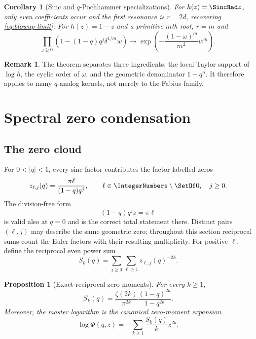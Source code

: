 \documentclass[11pt]{article}
\newtheorem{proposition}[theorem]{Proposition}
\newtheorem{corollary}[theorem]{Corollary}
\theoremstyle{definition}
\newtheorem{remark}[theorem]{Remark}
\begin{document}
\begin{corollary}[Sinc and $q$-Pochhammer specializations]
For $h(z)=\SincRad z$, only even coefficients occur and the first resonance is $r=2d$, recovering \cref{eq:blowup-limit}.  For $h(z)=1-z$ and a primitive $m$th root, $r=m$ and
\begin{equation}
 \prod_{j\ge0}
 \left(1-(1-q)q^j\delta^{1/m}w\right)
 \longrightarrow
 \exp\left(-\frac{(1-\omega)^m}{m^2}w^m\right).
 \label{eq:qpoch-germ-limit}
\end{equation}
\end{corollary}

\begin{remark}
The theorem separates three ingredients: the local Taylor support of $\log h$, the cyclic order of $\omega$, and the geometric denominator $1-q^n$.  It therefore applies to many $q$-analog kernels, not merely to the Fabius family.
\end{remark}

\section{Spectral zero condensation}

\subsection{The zero cloud}

For $0<|q|<1$, every sinc factor contributes the factor-labelled zeros
\begin{equation}
 z_{\ell,j}(q)=\frac{\pi\ell}{(1-q)q^j},
 \qquad \ell\in\IntegerNumbers\setminus\SetOf0,
 \quad j\ge0.
 \label{eq:zeros}
\end{equation}
The division-free form
\[
 (1-q)q^jz=\pi\ell
\]
is valid also at $q=0$ and is the correct total statement there.  Distinct
pairs $(\ell,j)$ may describe the same geometric zero; throughout this
section reciprocal sums count the Euler factors with their resulting
multiplicity.
For positive $\ell$, define the reciprocal even power sum
\begin{equation}
 S_k(q)=\sum_{j\ge0}\sum_{\ell\ge1}z_{\ell,j}(q)^{-2k}.
 \label{eq:Sk-def}
\end{equation}

\begin{proposition}[Exact reciprocal zero moments]
For every $k\ge1$,
\begin{equation}
 \boxed{
 S_k(q)=\frac{\zeta(2k)}{\pi^{2k}}
 \frac{(1-q)^{2k}}{1-q^{2k}}.}
 \label{eq:Sk}
\end{equation}
Moreover, the master logarithm is the canonical zero-moment expansion
\begin{equation}
 \log\Phi(q,z)=-\sum_{k\ge1}\frac{S_k(q)}{k}z^{2k}.
 \label{eq:log-Sk}
\end{equation}
\end{proposition}
\end{document}
